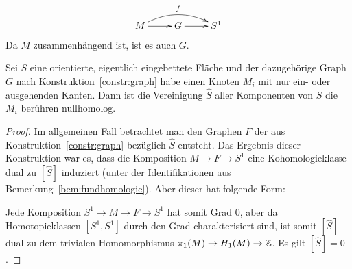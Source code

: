 \begin{constr}
	\begin{align}
		\begin{xy}
				\xymatrix{M \ar[r] \ar@/^1pc/[rr]^f & G \ar[r] & S^1 }
			\end{xy}
		\label{eq:graphlift}
	\end{align}
	Da $M$ zusammenhängend ist, ist es auch $G$.
\end{constr}

\begin{cor}
	\label{cor:trennendeFlachen}
	Sei $S$ eine orientierte, eigentlich eingebettete Fläche und der dazugehörige Graph $G$ nach Konstruktion~\ref{constr:graph} habe einen Knoten $M_i$ mit nur ein- oder ausgehenden Kanten. Dann ist die Vereinigung $\hat S$ aller Komponenten von $S$ die $M_i$ berühren nullhomolog.
\end{cor}
\begin{proof}
	Im allgemeinen Fall betrachtet man den Graphen $F$ der aus Konstruktion~\ref{constr:graph} bezüglich $\hat S$ entsteht. Das Ergebnis dieser Konstruktion war es, dass die Komposition $M\to F \to S^1$ eine Kohomologieklasse dual zu $[\hat S]$ induziert (unter der Identifikationen aus Bemerkung~\ref{bem:fundhomologie}). Aber dieser hat folgende Form:
\begin{center}
\end{center}

	  Jede Komposition $S^1 \to M \to F \to S^1$ hat somit Grad 0, aber da Homotopieklassen $[S^1,S^1]$ durch den Grad charakterisiert sind, ist somit $[\hat S]$ dual zu dem trivialen Homomorphismus $\pi_1(M) \to H_1(M) \to \mathbb{Z}$. Es gilt $[\hat S] = 0$.


\end{proof}
